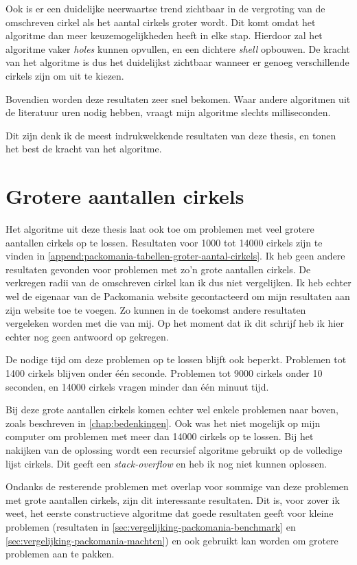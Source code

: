 \documentclass[12pt,a4paper,oneside]{book}
\begin{document}
Ook is er een duidelijke neerwaartse trend zichtbaar in de vergroting van de omschreven cirkel als het aantal cirkels groter wordt.
Dit komt omdat het algoritme dan meer keuzemogelijkheden heeft in elke stap.
Hierdoor zal het algoritme vaker \textit{holes} kunnen opvullen, en een dichtere \textit{shell} opbouwen.
De kracht van het algoritme is dus het duidelijkst zichtbaar wanneer er genoeg verschillende cirkels zijn om uit te kiezen.

Bovendien worden deze resultaten zeer snel bekomen.
Waar andere algoritmen uit de literatuur uren nodig hebben, vraagt mijn algoritme slechts milliseconden.

Dit zijn denk ik de meest indrukwekkende resultaten van deze thesis, en tonen het best de kracht van het algoritme.

\section{Grotere aantallen cirkels}

Het algoritme uit deze thesis laat ook toe om problemen met veel grotere aantallen cirkels op te lossen.
Resultaten voor 1000 tot 14000 cirkels zijn te vinden in \autoref{append:packomania-tabellen-groter-aantal-cirkels}.
Ik heb geen andere resultaten gevonden voor problemen met zo'n grote aantallen cirkels.
De verkregen radii van de omschreven cirkel kan ik dus niet vergelijken.
Ik heb echter wel de eigenaar van de Packomania website gecontacteerd om mijn resultaten aan zijn website toe te voegen.
Zo kunnen in de toekomst andere resultaten vergeleken worden met die van mij.
Op het moment dat ik dit schrijf heb ik hier echter nog geen antwoord op gekregen.

De nodige tijd om deze problemen op te lossen blijft ook beperkt.
Problemen tot 1400 cirkels blijven onder één seconde.
Problemen tot 9000 cirkels onder 10 seconden, en 14000 cirkels vragen minder dan één minuut tijd.

Bij deze grote aantallen cirkels komen echter wel enkele problemen naar boven, zoals beschreven in \autoref{chap:bedenkingen}.
Ook was het niet mogelijk op mijn computer om problemen met meer dan 14000 cirkels op te lossen.
Bij het nakijken van de oplossing wordt een recursief algoritme gebruikt op de volledige lijst cirkels.
Dit geeft een \textit{stack-overflow} en heb ik nog niet kunnen oplossen. %

Ondanks de resterende problemen met overlap voor sommige van deze problemen met grote aantallen cirkels, zijn dit interessante resultaten.
Dit is, voor zover ik weet, het eerste constructieve algoritme dat goede resultaten geeft voor kleine problemen (resultaten in \autoref{sec:vergelijking-packomania-benchmark} en \autoref{sec:vergelijking-packomania-machten}) en ook gebruikt kan worden om grotere problemen aan te pakken.
\end{document}
